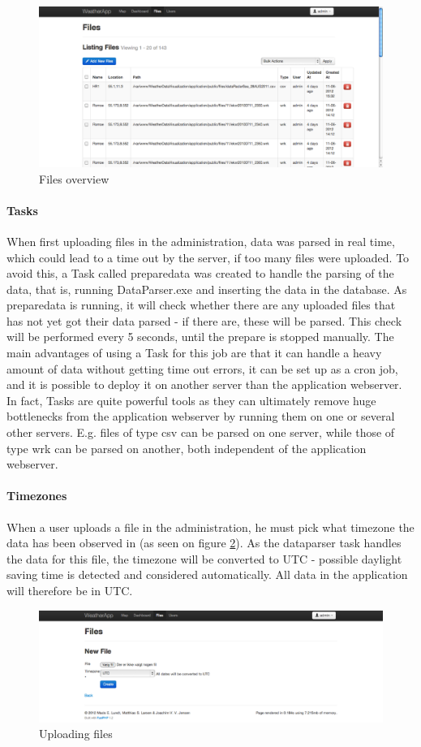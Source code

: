 \begin{figure}[htbp]
   \centering
   \includegraphics[width=1\linewidth]{figure/adminCRUD.eps}
   \caption{Files overview}
   \label{fig:admin}
\end{figure}

\paragraph{Tasks}
\label{sec:tasks}
When first uploading files in the administration, data was parsed in real time, which could lead to a time out by the server, if too many files were uploaded. To avoid this, a \textsf{Task} called \textsf{preparedata} was created to handle the parsing of the data, that is, running \textsf{DataParser.exe} and inserting the data in the database. As \textsf{preparedata} is running, it will check whether there are any uploaded files that has not yet got their data parsed - if there are, these will be parsed. This check will be performed every 5 seconds, until the \textsf{prepare} is stopped manually.
The main advantages of using a \textsf{Task} for this job are that it can handle a heavy amount of data without getting time out errors, it can be set up as a cron job, and it is possible to deploy it on another server than the application webserver.
In fact, \textsf{Tasks} are quite powerful tools as they can ultimately remove huge bottlenecks from the application webserver by running them on one or several other servers. E.g. files of type \textsf{csv} can be parsed on one server, while those of type \textsf{wrk} can be parsed on another, both independent of the application webserver.
\paragraph{Timezones}
\label{sec:timezones}
When a user uploads a file in the administration, he must pick what timezone the data has been observed in (as seen on figure \ref{fig:upload}). As the dataparser task handles the data for this file, the timezone will be converted to UTC - possible daylight saving time is detected and considered automatically. All data in the application will therefore be in UTC.

\begin{figure}[htbp]
   \centering
   \includegraphics[width=1\linewidth]{figure/uploadfiles.eps}
   \caption{Uploading files}
   \label{fig:upload}
\end{figure}